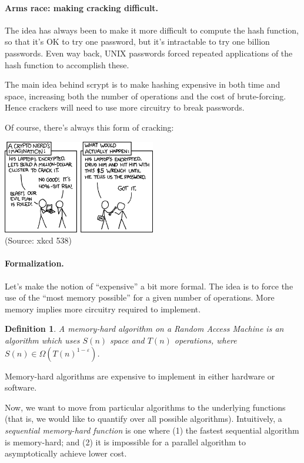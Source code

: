 \documentclass[a4paper]{report}
\begin{document}
\paragraph{Arms race: making cracking difficult.} The idea has always been
to make it more difficult to compute the hash function, so that it's OK to
try one password, but it's intractable to try one billion passwords. Even way back,
UNIX passwords forced repeated applications of the hash function to accomplish these.

The main idea behind scrypt is to make hashing expensive in both time and space,
increasing both the number of operations and the cost of brute-forcing.
Hence crackers will need to use more circuitry to break passwords.

Of course, there's always this form of cracking:
\begin{center}
\includegraphics[width=0.5\textwidth]{images/xkcd-538}\\
\hfill (Source: xkcd 538)
\end{center}

\newtheorem{defn}{Definition}

\paragraph{Formalization.} Let's make the notion of ``expensive'' a bit more formal.
The idea is to force the use of the ``most memory possible'' for a given number of
operations. More memory implies more circuitry required to implement.

    \begin{defn}
      A \emph{memory-hard} algorithm on a Random Access Machine is an
      algorithm which uses $S(n)$ space and $T(n)$ operations, where
      $S(n) \in \Omega(T(n)^{1-\varepsilon})$.
    \end{defn}

Memory-hard algorithms are expensive to implement in either hardware or software.

Now, we want to move from particular algorithms to the underlying
functions (that is, we would like to quantify over all possible
algorithms). Intuitively, a \emph{sequential memory-hard function} is
one where (1) the fastest sequential algorithm is memory-hard; and (2)
it is impossible for a parallel algorithm to asymptotically achieve
lower cost.
\end{document}
